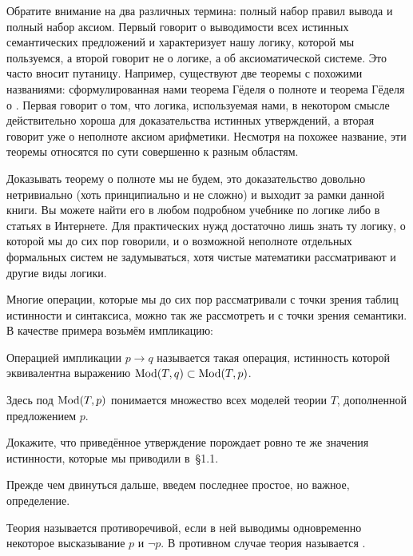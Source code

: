 Обратите внимание на два различных термина: полный набор правил вывода и полный набор аксиом. Первый говорит о выводимости всех истинных семантических предложений  и характеризует нашу логику, которой мы пользуемся, а второй говорит не о логике, а об аксиоматической системе. Это часто вносит путаницу. Например, существуют две теоремы с похожими названиями: сформулированная нами теорема Гёделя о полноте и теорема Гёделя о . Первая говорит о том, что логика, используемая нами, в некотором смысле действительно хороша для доказательства истинных утверждений, а вторая говорит уже о неполноте аксиом арифметики. Несмотря на похожее название, эти теоремы относятся по сути совершенно к разным областям.

Доказывать теорему о полноте мы не будем, это доказательство довольно нетривиально (хоть принципиально и не сложно) и выходит за рамки данной книги. Вы можете найти его в любом подробном учебнике по логике либо в статьях в Интернете. Для практических нужд достаточно лишь знать ту логику, о которой мы до сих пор говорили, и о возможной неполноте отдельных формальных систем не задумываться, хотя чистые математики рассматривают и другие виды логики.

Многие операции, которые мы до сих пор рассматривали с точки зрения таблиц истинности и синтаксиса, можно так же рассмотреть и с точки зрения семантики.  В качестве примера возьмём импликацию:

\begin{definition}
Операцией импликации $p\to q$ называется такая операция, истинность которой эквивалентна выражению $\operatorname{Mod}(T, q)\subset\operatorname{Mod}(T, p)$.
\end{definition}

Здесь под $\operatorname{Mod}(T, p)$ понимается множество всех моделей теории $T$, дополненной предложением $p$.

\begin{exercise}
Докажите, что приведённое утверждение порождает ровно те же значения истинности, которые мы приводили в~\S1.1.
\end{exercise}

Прежде чем двинуться дальше, введем последнее простое, но важное, определение.

\begin{definition}
Теория называется противоречивой, если в ней выводимы одновременно некоторое высказывание $p$ и $\neg p$. В противном случае теория называется .
\end{definition}

